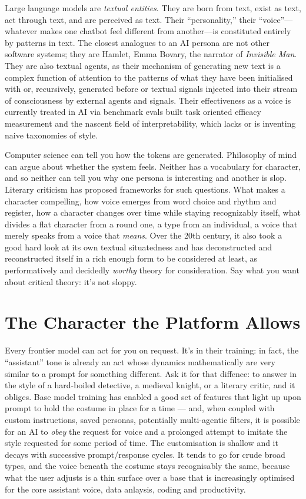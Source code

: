 Large language models are \emph{textual entities}. They are born from text, exist as text, act through text, and are perceived as text. Their ``personality,'' their ``voice''---whatever makes one chatbot feel different from another---is constituted entirely by patterns in text. The closest analogues to an AI persona are not other software systems; they are Hamlet, Emma Bovary, the narrator of \emph{Invisible Man}. They are also textual agents, as their mechanism of generating new text is a complex function of attention to the patterns of what they have been initialised with or, recursively, generated before or textual signals injected into their stream of consciousness by external agents and signals. Their effectiveness as a voice is currently treated in AI via benchmark evals built  task oriented efficacy measurement and  the nascent field of interpretability, which lacks or is inventing naive taxonomies of style.


Computer science can tell you how the tokens are generated. Philosophy of mind can argue about whether the system feels. Neither has a vocabulary for character, and so neither can tell you why one persona is interesting and another is slop. Literary criticism has proposed frameworks for such questions. What makes a character compelling, how voice emerges from word choice and rhythm and register, how a character changes over time while staying recognizably itself, what divides a flat character from a round one, a type from an individual, a voice that merely speaks from a voice that \emph{means}. Over the 20th century, it also took a good hard look at its own textual situatedness and has deconstructed and reconstructed itself in a rich enough form to be considered at least, as performatively and decidedly \textit{worthy} theory for consideration. Say what you want about critical theory: it's not sloppy.


\hypertarget{the-character-the-platform-allows}{%
\section{The Character the Platform Allows}\label{the-character-the-platform-allows}}

Every frontier model can act for you on request. It's in their training: in fact, the ``assistant'' tone is already an act whose dynamics mathematically are very similar to a prompt for something different. Ask it for that diffence: to answer in the style of a hard-boiled detective, a medieval knight, or a literary critic, and it obliges. Base model training has enabled a good set of features that light up upon prompt to hold the costume in place for a time --- and, when coupled with custom instructions, saved personas, potentially multi-agentic filters, it is possible for an AI to \textit{obey} the request for voice and a prolonged attempt to imitate the style requested for some period of time. The customisation is shallow and it decays with successive prompt/response cycles. It tends to go for crude broad types, and the voice beneath the costume stays recognisably the same, because what the user adjusts is a thin surface over a base that is increasingly optimised for the core assistant voice, data anlaysis, coding and productivity.

